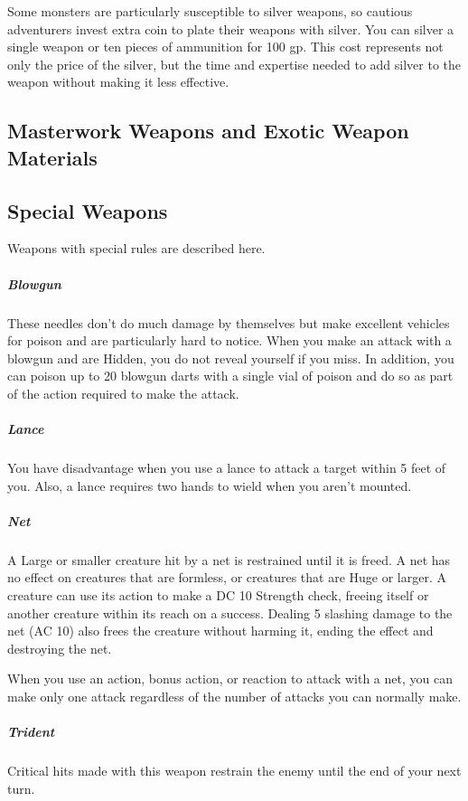 Some monsters are particularly susceptible to silver weapons, so cautious adventurers invest extra coin to plate their weapons with silver. You can silver a single weapon or ten pieces of ammunition for 100 gp. This cost represents not only the price of the silver, but the time and expertise needed to add silver to the weapon without making it less effective.

\subsection{Masterwork Weapons and Exotic Weapon Materials}


\subsection{Special Weapons}

Weapons with special rules are described here.

\subparagraph*{Blowgun} These needles don't do much damage by themselves but make excellent vehicles for poison and are particularly hard to notice. When you make an attack with a blowgun and are Hidden, you do not reveal yourself if you miss. In addition, you can poison up to 20 blowgun darts with a single vial of poison and do so as part of the action required to make the attack.

\subparagraph*{Lance} You have disadvantage when you use a lance to attack a target within 5 feet of you. Also, a lance requires two hands to wield when you aren't mounted.

\subparagraph*{Net} A Large or smaller creature hit by a net is restrained until it is freed. A net has no effect on creatures that are formless, or creatures that are Huge or larger. A creature can use its action to make a DC 10 Strength check, freeing itself or another creature within its reach on a success. Dealing 5 slashing damage to the net (AC 10) also frees the creature without harming it, ending the effect and destroying the net.

When you use an action, bonus action, or reaction to attack with a net, you can make only one attack regardless of the number of attacks you can normally make.

\subparagraph*{Trident} Critical hits made with this weapon restrain the enemy until the end of your next turn.

